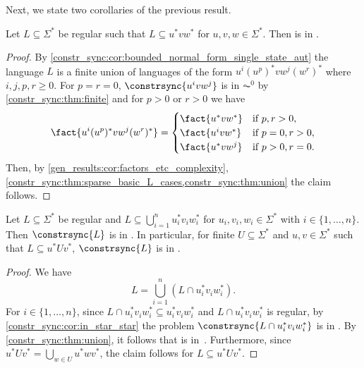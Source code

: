 Next, we state two corollaries of the previous result.

\begin{corollary}
	\label{constr_sync:cor:in_star_star}
	Let $L \subseteq \Sigma^*$ be regular such that $L \subseteq u^*vw^*$ for $u,v,w \in \Sigma^*$.
	Then  is in \LOGSPACE.
\end{corollary}
\begin{proof}
	By \cref{constr_sync:cor:bounded_normal_form_single_state_aut} 
	the language $L$ is a finite union of languages
	of the form $u^i (u^p)^* v w^j (w^r)^*$
	where $i,j,p,r \ge 0$.
	For $p = r = 0$, $\constrsync{u^i v w^j}$
	is in $\AC^0$ by \cref{constr_sync:thm:finite}
	and for $p > 0$ or $r > 0$ we have
	\[
	\fact{u^i(u^p)^* v w^j (w^r)^*}
	= \begin{cases} 
		\fact{u^* v w^*} & \text{if } p, r > 0, \\
		\fact{u^i v w^*} & \text{if } p = 0, r > 0, \\
		\fact{u^* v w^j} & \text{if } p > 0, r = 0.
	\end{cases}
	\]
	Then, by \cref{gen_results:cor:factors_etc_complexity}, 
	\cref{constr_sync:thm:sparse_basic_L_cases,constr_sync:thm:union} 
	the claim follows.
\end{proof}

\begin{corollary}
	\label{constr_sync:cor:u_star_finite_v_star}
	Let $L \subseteq \Sigma^*$ be regular
	and $L \subseteq \bigcup_{i=1}^n u_i^* v_i w_i^*$
	for $u_i, v_i, w_i \in \Sigma^*$ with $i \in \{1,\ldots,n\}$.
	Then $\constrsync{L}$
	is in \LOGSPACE.	
	In particular, for finite $U \subseteq \Sigma^*$  and $u,v \in \Sigma^*$
	such that $L \subseteq u^* U v^*$, $\constrsync{L}$
	is in \LOGSPACE.	
\end{corollary}
\begin{proof}
	We have
	\[
	L = \bigcup_{i=1}^n ( L \cap u_i^* v_i w_i^* ).
	\]
	For $i \in \{1,\ldots,n\}$, since $L \cap u_i^* v_i w_i^* \subseteq u_i^* v_i w_i^*$
	and $L \cap u_i^* v_i w_i^*$ is regular, by \cref{constr_sync:cor:in_star_star} 
	the problem $\constrsync{L \cap u_i^* v_i w_i^*}$ is in \LOGSPACE.
	By \cref{constr_sync:thm:union},
	it follows that 
	is in~\LOGSPACE. 
	Furthermore, since
	$u^*Uv^* = \bigcup_{w \in U} u^*wv^*$,
	the claim follows  for $L \subseteq u^*Uv^*$.
\end{proof}

